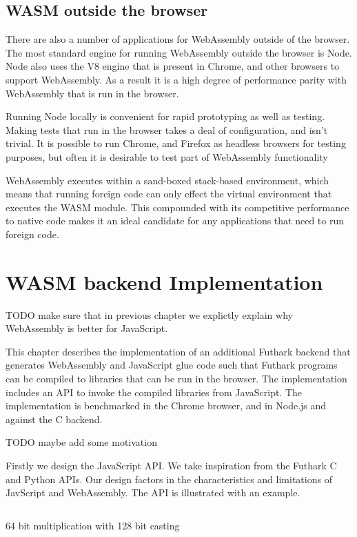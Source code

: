 \documentclass[11pt]{book}
\begin{document}
\section{WASM outside the browser}

There are also a number of applications for WebAssembly outside of the browser. The most standard engine for running WebAssembly outside the browser is Node. Node also uses the V8 engine that is present in Chrome, and other browsers to support WebAssembly. As a result it is a high degree of performance parity with WebAssembly that is run in the browser.

Running Node locally is convenient for rapid prototyping as well as testing. Making tests that run in the browser takes a deal of configuration, and isn't trivial. It is possible to run Chrome, and Firefox as headless browsers for testing purposes, but often it is desirable to test part of WebAssembly functionality


WebAssembly executes within a sand-boxed stack-based environment, which means that running foreign code can only effect the virtual environment that executes the WASM module. This compounded with its competitive performance to native code makes it an ideal candidate for any applications that need to run foreign code. 




\chapter{WASM backend Implementation}

TODO make sure that in previous chapter we explictly explain why WebAssembly is better for JavaScript. 



This chapter describes the implementation of an additional Futhark backend that generates WebAssembly and JavaScript glue code such that Futhark programs can be compiled to libraries that can be run in the browser. The implementation includes an API to invoke the compiled libraries from JavaScript. The implementation is benchmarked in the Chrome browser, and in Node.js and against the C backend.

TODO maybe add some motivation

Firstly we design the JavaScript API. We take inspiration from the Futhark C and Python APIs. Our design factors in the characteristics and limitations of JavScript and WebAssembly. The API is illustrated with an example.


\begin{listing}[H] 
        \inputminted[fontsize=\small,baselinestretch=0.5,linenos]{C}{code/compiler/int128_c.c}
        \caption{64 bit multiplication with 128 bit casting}
        \label{lst:int128}    
\end{listing} 
\end{document}
